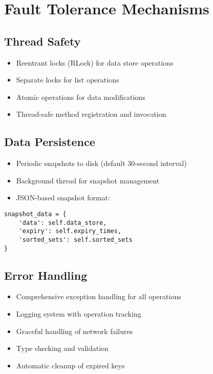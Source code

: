 \documentclass[11pt]{article}
\begin{document}
\section{Fault Tolerance Mechanisms}

\subsection{Thread Safety}
\begin{itemize}
    \item Reentrant locks (RLock) for data store operations
    \item Separate locks for list operations
    \item Atomic operations for data modifications
    \item Thread-safe method registration and invocation
\end{itemize}

\subsection{Data Persistence}
\begin{itemize}
    \item Periodic snapshots to disk (default 30-second interval)
    \item Background thread for snapshot management
    \item JSON-based snapshot format:
\end{itemize}

\begin{lstlisting}
snapshot_data = {
    'data': self.data_store,
    'expiry': self.expiry_times,
    'sorted_sets': self.sorted_sets 
}
\end{lstlisting}

\subsection{Error Handling}
\begin{itemize}
    \item Comprehensive exception handling for all operations
    \item Logging system with operation tracking
    \item Graceful handling of network failures
    \item Type checking and validation
    \item Automatic cleanup of expired keys
\end{itemize}
\end{document}

